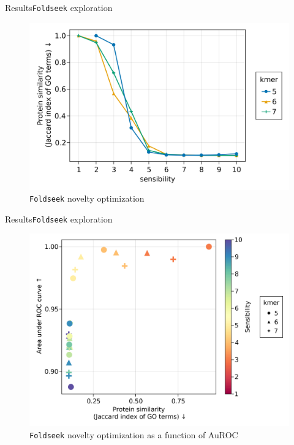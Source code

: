 \documentclass{beamer}
\begin{document}
\begin{frame}{Results}{\texttt{Foldseek} exploration}
	\begin{figure}
	\includegraphics[width=0.8\linewidth]{figures/Jaccard_optimization.png}
	\caption{\texttt{Foldseek} novelty optimization}
	\end{figure}
\end{frame}

\begin{frame}{Results}{\texttt{Foldseek} exploration}
	\begin{figure}
	\includegraphics[width=0.8\linewidth]{figures/JaccardvsAuROC_optimization.png}
	\caption{\texttt{Foldseek} novelty optimization as a function of AuROC}
	\end{figure}
\end{frame}
\end{document}

